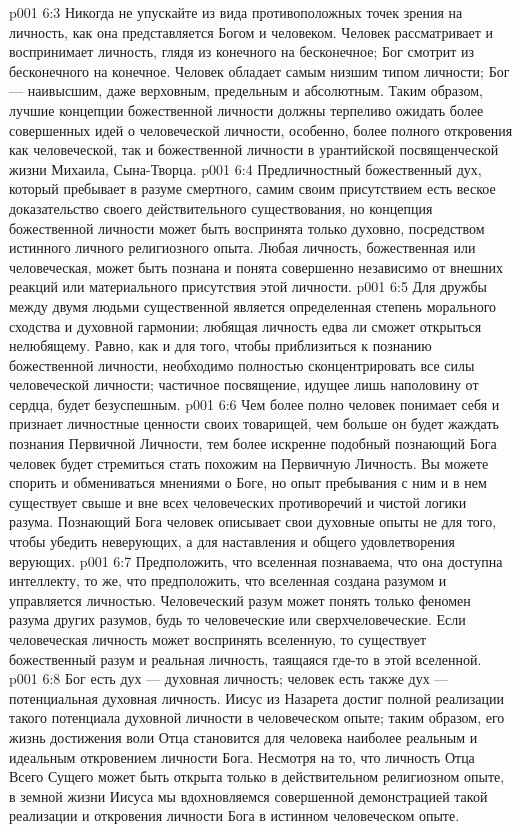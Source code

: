 \vs p001 6:3 Никогда не упускайте из вида противоположных точек зрения на личность, как она представляется Богом и человеком. Человек рассматривает и воспринимает личность, глядя из конечного на бесконечное; Бог смотрит из бесконечного на конечное. Человек обладает самым низшим типом личности; Бог --- наивысшим, даже верховным, предельным и абсолютным. Таким образом, лучшие концепции божественной личности должны терпеливо ожидать более совершенных идей о человеческой личности, особенно, более полного откровения как человеческой, так и божественной личности в урантийской посвященческой жизни Михаила, Сына\hyp{}Творца.
\vs p001 6:4 \pc Предличностный божественный дух, который пребывает в разуме смертного, самим своим присутствием есть веское доказательство своего действительного существования, но концепция божественной личности может быть воспринята только духовно, посредством истинного личного религиозного опыта. Любая личность, божественная или человеческая, может быть познана и понята совершенно независимо от внешних реакций или материального присутствия этой личности.
\vs p001 6:5 Для дружбы между двумя людьми существенной является определенная степень морального сходства и духовной гармонии; любящая личность едва ли сможет открыться нелюбящему. Равно, как и для того, чтобы приблизиться к познанию божественной личности, необходимо полностью сконцентрировать все силы человеческой личности; частичное посвящение, идущее лишь наполовину от сердца, будет безуспешным.
\vs p001 6:6 Чем более полно человек понимает себя и признает личностные ценности своих товарищей, чем больше он будет жаждать познания Первичной Личности, тем более искренне подобный познающий Бога человек будет стремиться стать похожим на Первичную Личность. Вы можете спорить и обмениваться мнениями о Боге, но опыт пребывания с ним и в нем существует свыше и вне всех человеческих противоречий и чистой логики разума. Познающий Бога человек описывает свои духовные опыты не для того, чтобы убедить неверующих, а для наставления и общего удовлетворения верующих.
\vs p001 6:7 \pc Предположить, что вселенная познаваема, что она доступна интеллекту, то же, что предположить, что вселенная создана разумом и управляется личностью. Человеческий разум может понять только феномен разума других разумов, будь то человеческие или сверхчеловеческие. Если человеческая личность может воспринять вселенную, то существует божественный разум и реальная личность, таящаяся где\hyp{}то в этой вселенной.
\vs p001 6:8 \pc Бог есть дух --- духовная личность; человек есть также дух --- потенциальная духовная личность. Иисус из Назарета достиг полной реализации такого потенциала духовной личности в человеческом опыте; таким образом, его жизнь достижения воли Отца становится для человека наиболее реальным и идеальным откровением личности Бога. Несмотря на то, что личность Отца Всего Сущего может быть открыта только в действительном религиозном опыте, в земной жизни Иисуса мы вдохновляемся совершенной демонстрацией такой реализации и откровения личности Бога в истинном человеческом опыте.
